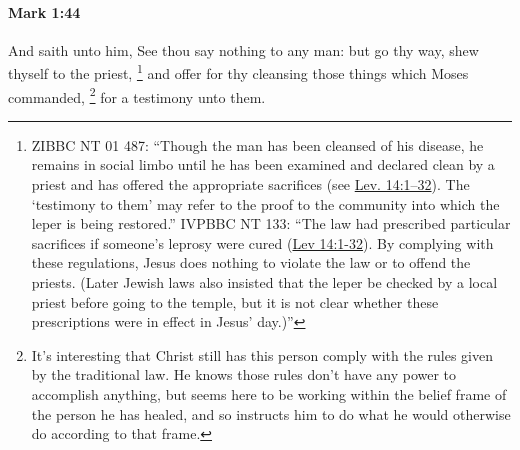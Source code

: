 		\paragraph{Mark 1:44} %
			\label{MARK-1-44}

			And saith unto him, See thou say nothing to any man: but go thy way, shew thyself to the priest,%
				\footnote{%
					ZIBBC NT 01 487: ``Though the man has been cleansed of his disease, he remains in social limbo until he has been examined and declared clean by a priest and has offered the appropriate sacrifices (see \hyperref[LEVITICUS-14-1]{Lev. 14:1--32}). The `testimony to them' may refer to the proof to the community into which the leper is being restored.'' IVPBBC NT 133: ``The law had prescribed particular sacrifices if someone's leprosy were cured (\hyperref[LEVITICUS-14-1]{Lev 14:1-32}). By complying with these regulations, Jesus does nothing to violate the law or to offend the priests. (Later Jewish laws also insisted that the leper be checked by a local priest before going to the temple, but it is not clear whether these prescriptions were in effect in Jesus' day.)''
					}
			and offer for thy cleansing those things which Moses commanded,%
				\footnote{%
					It's interesting that Christ still has this person comply with the rules given by the traditional law. He knows those rules don't have any power to accomplish anything, but seems here to be working within the belief frame of the person he has healed, and so instructs him to do what he would otherwise do according to that frame.
					}
			for a testimony unto them.

			\begin{framed}
			\scriptsize
				\begin{compactdesc}
					\item[SBLG] 
				\end{compactdesc}
			\end{framed}

